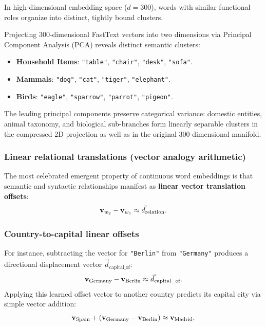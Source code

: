 \documentclass[../../../main.tex]{subfiles}
\begin{document}
In high-dimensional embedding space ($d = 300$), words with similar functional roles organize into distinct, tightly bound clusters.

Projecting 300-dimensional FastText vectors into two dimensions via Principal Component Analysis (PCA) reveals distinct semantic clusters:
\begin{itemize}
    \item \textbf{Household Items}: \texttt{"table"}, \texttt{"chair"}, \texttt{"desk"}, \texttt{"sofa"}.
    \item \textbf{Mammals}: \texttt{"dog"}, \texttt{"cat"}, \texttt{"tiger"}, \texttt{"elephant"}.
    \item \textbf{Birds}: \texttt{"eagle"}, \texttt{"sparrow"}, \texttt{"parrot"}, \texttt{"pigeon"}.
\end{itemize}
The leading principal components preserve categorical variance: domestic entities, animal taxonomy, and biological sub-branches form linearly separable clusters in the compressed 2D projection as well as in the original 300-dimensional manifold.

\subsubsection{Linear relational translations (vector analogy arithmetic)}
\label{subsec:relational_analogies}

The most celebrated emergent property of continuous word embeddings is that semantic and syntactic relationships manifest as \textbf{linear vector translation offsets}:
\begin{equation}
\label{eq:relational_offset_concept}
\mathbf{v}_{w_2} - \mathbf{v}_{w_1} \approx \vec{d}_{\text{relation}}.
\end{equation}

\subsubsection{Country-to-capital linear offsets}
For instance, subtracting the vector for \texttt{"Berlin"} from \texttt{"Germany"} produces a directional displacement vector $\vec{d}_{\text{capital\_of}}$:
\begin{equation}
\label{eq:rel_germany_berlin}
\mathbf{v}_{\text{Germany}} - \mathbf{v}_{\text{Berlin}} \approx \vec{d}_{\text{capital\_of}}.
\end{equation}
Applying this learned offset vector to another country predicts its capital city via simple vector addition:
\begin{equation}
\label{eq:rel_spain_madrid}
\mathbf{v}_{\text{Spain}} + (\mathbf{v}_{\text{Germany}} - \mathbf{v}_{\text{Berlin}}) \approx \mathbf{v}_{\text{Madrid}}.
\end{equation}
\end{document}
